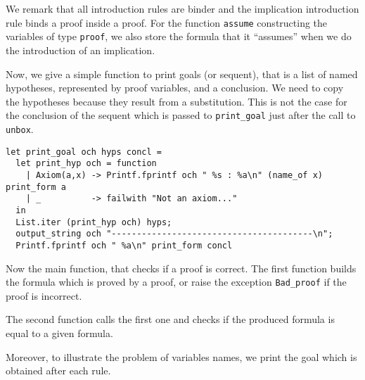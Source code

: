 \documentclass[11pt]{article}
\begin{document}
We remark that all introduction rules are binder and the
implication introduction rule binds a proof inside a proof.
For the function \verb#assume# constructing the variables of type
\verb#proof#, we also store the formula that it ``assumes'' when we do
the introduction of an implication.

Now, we give a simple function to print goals (or sequent), that is a
list of named hypotheses, represented by proof variables, and a
conclusion. We need to copy the hypotheses because they result from a
substitution. This is not the case for the conclusion of the sequent
which is passed to \verb#print_goal# just after the call to \verb#unbox#.
\begin{verbatim}
let print_goal och hyps concl =
  let print_hyp och = function
    | Axiom(a,x) -> Printf.fprintf och " %s : %a\n" (name_of x) print_form a
    | _          -> failwith "Not an axiom..."
  in
  List.iter (print_hyp och) hyps;
  output_string och "----------------------------------------\n";
  Printf.fprintf och " %a\n" print_form concl
\end{verbatim}

Now the main function, that checks if a proof is correct. The first
function builds the formula which is proved by a proof, or raise the
exception \verb#Bad_proof# if the proof is incorrect.

The second function calls the first one and checks if the produced
formula is equal to a given formula.

Moreover, to illustrate the problem of variables names, we print the
goal which is obtained after each rule.
\end{document}
